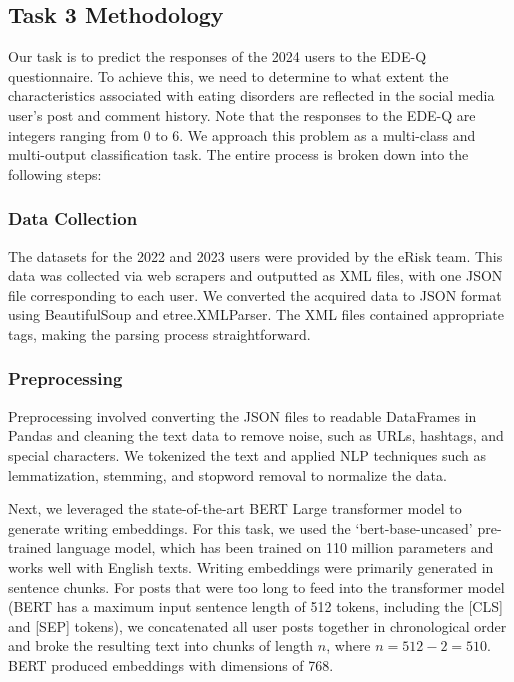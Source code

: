 \documentclass[]{style/ceurart}
\begin{document}
\subsection{Task 3 Methodology}

Our task is to predict the responses of the 2024 users to the EDE-Q questionnaire. To achieve this, we need to determine to what extent the characteristics associated with eating disorders are reflected in the social media user's post and comment history. Note that the responses to the EDE-Q are integers ranging from 0 to 6. We approach this problem as a multi-class and multi-output classification task. The entire process is broken down into the following steps:

\subsubsection{Data Collection}

The datasets for the 2022 and 2023 users were provided by the eRisk team. This data was collected via web scrapers and outputted as XML files, with one JSON file corresponding to each user. We converted the acquired data to JSON format using BeautifulSoup and etree.XMLParser. The XML files contained appropriate tags, making the parsing process straightforward.

\subsubsection{Preprocessing}

Preprocessing involved converting the JSON files to readable DataFrames in Pandas and cleaning the text data to remove noise, such as URLs, hashtags, and special characters. We tokenized the text and applied NLP techniques such as lemmatization, stemming, and stopword removal to normalize the data.

Next, we leveraged the state-of-the-art BERT\cite{devlin_bert_2019} Large transformer model to generate writing embeddings. For this task, we used the `bert-base-uncased'\cite{noauthor_google-bertbert-base-uncased_nodate} pre-trained language model, which has been trained on 110 million parameters and works well with English texts. Writing embeddings were primarily generated in sentence chunks. For posts that were too long to feed into the transformer model (BERT has a maximum input sentence length of 512 tokens, including the [CLS] and [SEP] tokens), we concatenated all user posts together in chronological order and broke the resulting text into chunks of length \( n \), where \( n = 512 - 2 = 510 \). BERT produced embeddings with dimensions of 768.
\end{document}
